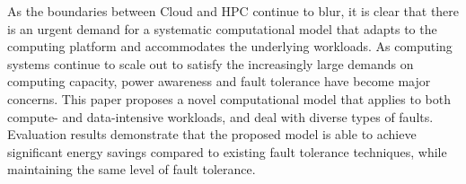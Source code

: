 As the boundaries between Cloud and HPC continue to blur, it is clear that there is an urgent demand for a systematic computational model that adapts to the computing platform and accommodates the underlying
workloads. As computing systems continue to scale out to satisfy
the increasingly large demands on computing capacity, power
awareness and fault tolerance have become major concerns. This paper proposes a novel computational model that applies to both compute- and data-intensive workloads, and deal with diverse types of faults. Evaluation results demonstrate that the proposed model is able to achieve significant energy savings compared to existing fault tolerance techniques, while maintaining the same level of fault tolerance.